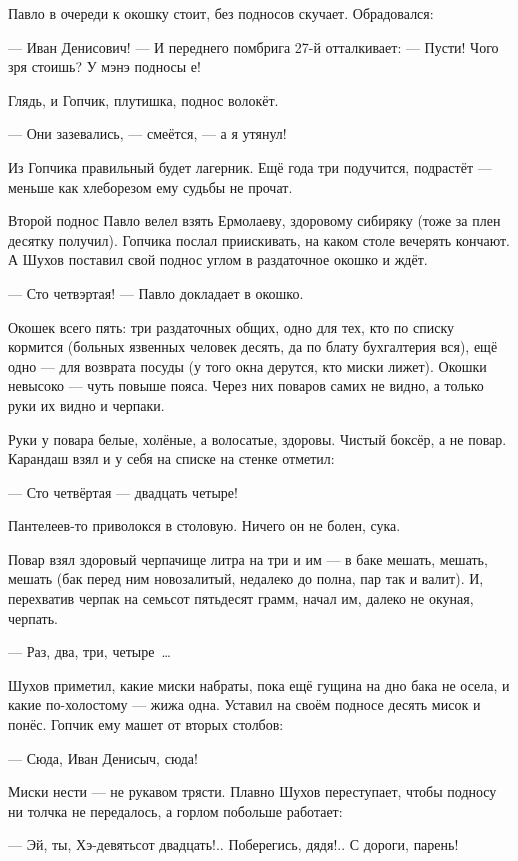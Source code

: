 Павло в очереди к окошку стоит, без подносов скучает. Обрадовался:

--- Иван Денисович! --- И переднего помбрига 27-й отталкивает: --- Пусти! Чого зря стоишь? У мэнэ подносы е!

Глядь, и Гопчик, плутишка, поднос волокёт.

--- Они зазевались, --- смеётся, --- а я утянул!

Из Гопчика правильный будет лагерник. Ещё года три подучится, подрастёт --- меньше как хлеборезом ему судьбы не прочат.

Второй поднос Павло велел взять Ермолаеву, здоровому сибиряку (тоже за плен десятку получил). Гопчика послал приискивать, на каком столе вечерять кончают. А Шухов поставил свой поднос углом в раздаточное окошко и ждёт.

--- Сто четвэртая! --- Павло докладает в окошко.

Окошек всего пять: три раздаточных общих, одно для тех, кто по списку кормится (больных язвенных человек десять, да по блату бухгалтерия вся), ещё одно --- для возврата посуды (у того окна дерутся, кто миски лижет). Окошки невысоко --- чуть повыше пояса. Через них поваров самих не видно, а только руки их видно и черпаки.

Руки у повара белые, холёные, а волосатые, здоровы. Чистый боксёр, а не повар. Карандаш взял и у себя на списке на стенке отметил:

--- Сто четвёртая --- двадцать четыре!

Пантелеев-то приволокся в столовую. Ничего он не болен, сука.

Повар взял здоровый черпачище литра на три и им --- в баке мешать, мешать, мешать (бак перед ним новозалитый, недалеко до полна, пар так и валит). И, перехватив черпак на семьсот пятьдесят грамм, начал им, далеко не окуная, черпать.

--- Раз, два, три, четыре~\dots{}

Шухов приметил, какие миски набраты, пока ещё гущина на дно бака не осела, и какие по-холостому --- жижа одна. Уставил на своём подносе десять мисок и понёс. Гопчик ему машет от вторых столбов:

--- Сюда, Иван Денисыч, сюда!

Миски нести --- не рукавом трясти. Плавно Шухов переступает, чтобы подносу ни толчка не передалось, а горлом побольше работает:

--- Эй, ты, Хэ-девятьсот двадцать!.. Поберегись, дядя!.. С дороги, парень!

